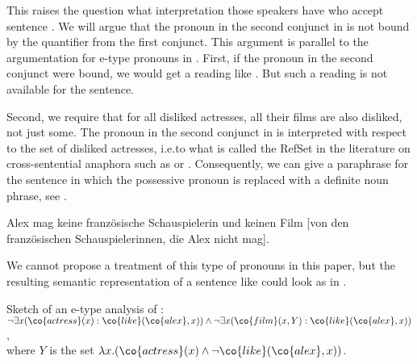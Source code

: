 \documentclass[output=paper]{langsci/langscibook}
\begin{document}
This raises the question what interpretation those speakers have who accept sentence . 
We will argue that the pronoun in the second conjunct in  is not bound by the quantifier from the first conjunct. 
This argument is parallel to the argumentation for e-type pronouns in \citet{Evans:77,Evans:80}.
First, if the pronoun in the second conjunct were bound, we would get a reading like . But such a reading is not available for the sentence.
%

%
Second, we require that for all disliked actresses, all their films are also disliked, not just some.
The pronoun in the second conjunct in  is interpreted with respect to the set of disliked actresses, i.e.\@ to what is called the RefSet in the literature on cross-sentential anaphora such as \citet{Nouwen:03} or \citet{Luecking:Ginzburg:19}.
Consequently, we can give a paraphrase for the sentence in which the possessive pronoun is replaced with a definite noun phrase, see .

\ea \label{para-ana-sogutwie}
Alex mag keine französische Schauspielerin und 
keinen Film [von den französischen Schauspielerinnen, die Alex nicht mag].
\glt {}
\z 

We cannot propose a treatment of this type of pronouns in this paper, but the resulting semantic representation of a sentence like  could look as in .

\ea \label{lf-etype}
Sketch of an e-type analysis of :\\
$\lnot \exists x (\co{actress}(x) : \co{like}(\co{alex},x)) \land
\lnot \exists x (\co{film}(x,Y) : \co{like}(\co{alex},x))$, 
\\where $Y$ is the set
$\lambda x. (\co{actress}(x) \land \lnot \co{like}(\co{alex},x))$.
\z 
\end{document}
